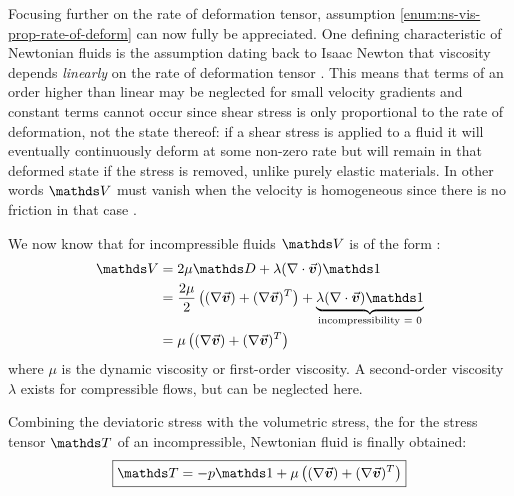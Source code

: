 Focusing further on the rate of deformation tensor, assumption \ref{enum:ns-vis-prop-rate-of-deform} can now fully be appreciated. One defining characteristic of Newtonian fluids is the assumption dating back to Isaac Newton that viscosity depends \textit{linearly} on the rate of deformation tensor \autocite*{anderson}. This means that terms of an order higher than linear may be neglected for small velocity gradients\autocite*{incompressible-flow-volker} and constant terms cannot occur since shear stress is only proportional to the rate of deformation, not the state thereof\autocite*{continuum-intro}: if a shear stress is applied to a fluid it will eventually continuously deform at some non-zero rate but will remain in that deformed state if the stress is removed, unlike purely elastic materials\autocite*{continuum-intro}. In other words $\mat{V}$ must vanish when the velocity is homogeneous since there is no friction in that case \autocite*{incompressible-flow-volker}.

We now know that for incompressible fluids $\mat{V}$ is of the form \autocite*{incompressible-flow-volker}:
\begin{align}
    \mat{V} & = 2\mu \mat{D}+ \lambda (\nabla\cdot\vek{v})\mat{1}                                                                                                  \\
            & = \frac{2\mu}{2}\left((\nabla \vek{v}) + (\nabla \vek{v})^T\right) + \underbrace{\lambda (\nabla\cdot\vek{v})\mat{1}}_{\text{incompressibility = 0}} \\
            & = \mu\left((\nabla \vek{v}) + (\nabla \vek{v})^T\right)
\end{align}
where $\mu$ is the dynamic viscosity\autocite*{anderson} or first-order viscosity\autocite*{incompressible-flow-volker}. A second-order viscosity $\lambda$ exists for compressible flows\autocite*{anderson}, but can be neglected here.

Combining the deviatoric stress with the volumetric stress, the  for the stress tensor $\mat{T}$ of an incompressible, Newtonian fluid is finally obtained\autocite*{tutorial}:
\begin{equation}\label{eq:consistutive-relation}
    \text{\fbox{$\mat{T} = -p\mat{1} + \mu\left((\nabla \vek{v}) + (\nabla \vek{v})^T\right)$}}
\end{equation}

